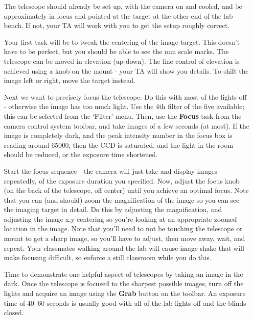 \begin{steps}
	\item The telescope should already be set up, with the camera on and cooled, and be approximately
	in focus and pointed at the target at the other end of the lab bench. If not, your TA will
	work with you to get the setup roughly correct.
	
	\item Your first task will be to tweak the centering of the image target. This doesn't have to be
	perfect, but you should be able to see the mm scale marks. The telescope can be moved in elevation (up-down). The fine control of elevation is achieved using a knob on the mount - your TA will show you details. To shift the image left or right, move the target instead.
	
	\item Next we want to precisely focus the telescope. Do this with most of the lights off - otherwise
	the image has too much light. Use the 4th filter of the five available; this can be selected
	from the ‘Filter’ menu. Then, use the \textbf{Focus} task from the camera control system toolbar,
	and take images of a few seconds (at most). If the image is completely dark, and the peak intensity number in the focus box is reading around 65000, then the CCD is saturated, and the light in the room should be reduced, or the exposure time shortened.
	
	\item Start the focus sequence - the camera will just
	take and display images repeatedly, of the exposure duration you specified. Now, adjust
	the focus knob (on the back of the telescope, off center) until you achieve an optimal focus.
	Note that you can (and should) zoom the magnification of the image so you can see the
	imaging target in detail. Do this by adjusting the magnification, and adjusting the image
	x,y centering so you’re looking at an appropriate zoomed location in the image. Note that
	you’ll need to not be touching the telescope or mount to get a sharp image, so you’ll
	have to adjust, then move away, wait, and repeat. Your classmates walking around the lab
	will cause image shake that will make focusing difficult, so enforce a still classroom while
	you do this.
	
	\item Time to demonstrate one helpful aspect of telescopes by taking an image in the dark. Once the telescope is focused to the sharpest possible images, turn off the lights and acquire an image using the
	\textbf{Grab} button on the toolbar. An exposure time of 40--60 seconds is usually good with all of
	the lab lights off and the blinds closed.
	

\end{steps}
